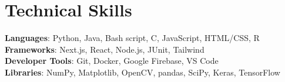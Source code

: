\documentclass[letterpaper,11pt]{article}
\begin{document}
%
\section{Technical Skills}
 \begin{itemize}[leftmargin=0.15in, label={}]
    \small{\item{
     \textbf{Languages}{: Python, Java, Bash script, C, JavaScript, HTML/CSS, R} \\
     \textbf{Frameworks}{: Next.js, React, Node.js, JUnit, Tailwind} \\
     \textbf{Developer Tools}{: Git, Docker, Google Firebase, VS Code} \\
     \textbf{Libraries}{: NumPy, Matplotlib, OpenCV, pandas, SciPy, Keras, TensorFlow}
    }}
 \end{itemize}


\end{document}
